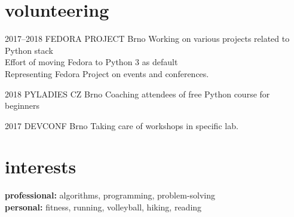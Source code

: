 \documentclass[]{friggeri-cv} %
\begin{document}

\section{volunteering}

\begin{entrylist}

\entry
{2017--2018}
{FEDORA PROJECT}
{Brno}
{Working on various projects related to Python stack \\
Effort of moving Fedora to Python 3 as default \\
Representing Fedora Project on events and conferences.}

\entry
{2018}
{PYLADIES CZ}
{Brno}
{Coaching attendees of free Python course for beginners}

\entry
{2017}
{DEVCONF}
{Brno}
{Taking care of workshops in specific lab.}

\end{entrylist}

\filbreak
\section{interests}

\textbf{professional:} algorithms, programming, problem-solving \\
\textbf{personal:} fitness, running, volleyball, hiking, reading

\end{document}
